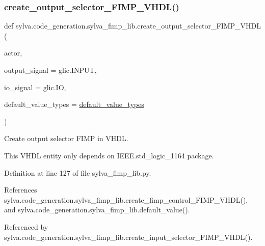 \subsubsection{\texorpdfstring{create\+\_\+output\+\_\+selector\+\_\+\+F\+I\+M\+P\+\_\+\+V\+H\+D\+L()}{create\_output\_selector\_FIMP\_VHDL()}}
{\footnotesize\ttfamily def sylva.\+code\+\_\+generation.\+sylva\+\_\+fimp\+\_\+lib.\+create\+\_\+output\+\_\+selector\+\_\+\+F\+I\+M\+P\+\_\+\+V\+H\+DL (\begin{DoxyParamCaption}\item[{}]{actor,  }\item[{}]{output\+\_\+signal = {\ttfamily glic.INPUT},  }\item[{}]{io\+\_\+signal = {\ttfamily glic.IO},  }\item[{}]{default\+\_\+value\+\_\+types = {\ttfamily \hyperlink{namespacesylva_1_1code__generation_1_1sylva__fimp__lib_aa8422a786f50398770d5f045867640e4}{default\+\_\+value\+\_\+types}} }\end{DoxyParamCaption})}

\begin{DoxyVerb}Create output selector FIMP in VHDL.

This VHDL entity only depends on IEEE.std_logic_1164 package.
\end{DoxyVerb}
 

Definition at line 127 of file sylva\+\_\+fimp\+\_\+lib.\+py.



References sylva.\+code\+\_\+generation.\+sylva\+\_\+fimp\+\_\+lib.\+create\+\_\+fimp\+\_\+control\+\_\+\+F\+I\+M\+P\+\_\+\+V\+H\+D\+L(), and sylva.\+code\+\_\+generation.\+sylva\+\_\+fimp\+\_\+lib.\+default\+\_\+value().



Referenced by sylva.\+code\+\_\+generation.\+sylva\+\_\+fimp\+\_\+lib.\+create\+\_\+input\+\_\+selector\+\_\+\+F\+I\+M\+P\+\_\+\+V\+H\+D\+L().


